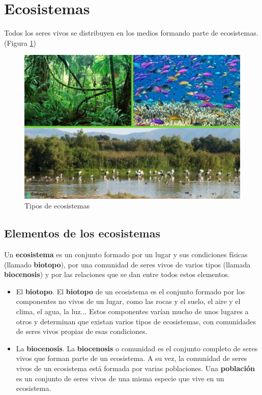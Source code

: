 \section{Ecosistemas}

Todos los seres vivos se distribuyen en los medios formando parte de ecosistemas. (Figura \ref{fig:tipos-ecosistemas})

\begin{figure}[!ht]
    \centering
    \includegraphics[width=0.7\linewidth]{Tema1/20_Tipos_ecosistemas.jpg}
    \caption{Tipos de ecosistemas}
    \label{fig:tipos-ecosistemas}
\end{figure}

\subsection{Elementos de los ecosistemas}

Un \textbf{ecosistema} es un conjunto formado por un lugar y sus condiciones físicas (llamado \textbf{biotopo}), por una comunidad de seres vivos de varios tipos (llamada \textbf{biocenosis}) y por las relaciones que se dan entre todos estos elementos.

\begin{itemize}
    \item El \textbf{biotopo}. El \textbf{biotopo} de un ecosistema es el conjunto formado por los componentes no vivos de un lugar, como las rocas y el suelo, el aire y el clima, el agua, la luz... Estos componentes varían mucho de unos lugares a otros y determinan que existan varios tipos de ecosistemas, con comunidades de seres vivos propias de esas condiciones.
    \item La \textbf{biocenosis}. La \textbf{biocenosis} o comunidad es el conjunto completo de seres vivos que forman parte de un ecosistema. A su vez, la comunidad de seres vivos de un ecosistema está formada por varias poblaciones. Una \textbf{población} es un conjunto de seres vivos de una misma especie que vive en un ecosistema.
\end{itemize}

